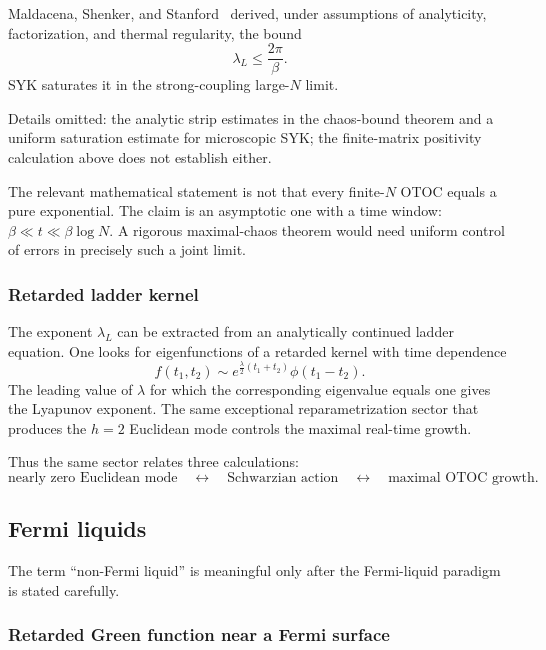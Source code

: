\documentclass[11pt]{article}
\numberwithin{equation}{section}
\theoremstyle{exposition}
\theoremstyle{result}
\begin{document}
Maldacena, Shenker, and Stanford~\cite{MSS} derived, under assumptions of analyticity, factorization, and thermal regularity, the bound
\begin{equation}
\lambda_L\le \frac{2\pi}{\beta}.
\label{eq:chaosbound}
\end{equation}
SYK saturates it in the strong-coupling large-$N$ limit.

Details omitted: the analytic strip estimates in the chaos-bound theorem and a uniform saturation estimate for microscopic SYK; the finite-matrix positivity calculation above does not establish either.

The relevant mathematical statement is not that every finite-$N$ OTOC equals a pure exponential. The claim is an asymptotic one with a time window: $\beta\ll t\ll \beta\log N$. A rigorous maximal-chaos theorem would need uniform control of errors in precisely such a joint limit.

\subsubsection{Retarded ladder kernel}

The exponent $\lambda_L$ can be extracted from an analytically continued ladder equation. One looks for eigenfunctions of a retarded kernel with time dependence
\begin{equation*}
f(t_1,t_2)\sim e^{\frac{\lambda}{2}(t_1+t_2)}\phi(t_1-t_2).
\end{equation*}
The leading value of $\lambda$ for which the corresponding eigenvalue equals one gives the Lyapunov exponent. The same exceptional reparametrization sector that produces the $h=2$ Euclidean mode controls the maximal real-time growth.

Thus the same sector relates three calculations:
\begin{equation*}
\text{nearly zero Euclidean mode}
\quad\leftrightarrow\quad
\text{Schwarzian action}
\quad\leftrightarrow\quad
\text{maximal OTOC growth}.
\end{equation*}

\subsection{Fermi liquids}

The term ``non-Fermi liquid'' is meaningful only after the Fermi-liquid paradigm is stated carefully.

\subsubsection{Retarded Green function near a Fermi surface}
\end{document}
